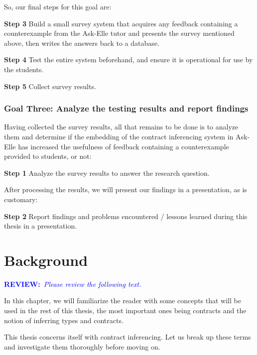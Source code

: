 \documentclass[10pt]{report}
\newcommand{\annotate}[3]{
	\begin{scriptsize}
	\textcolor{#1}{\textbf{#2}~\textit{#3}}
	\end{scriptsize}\newline}
\newcommand{\review}{\annotate{blue} {REVIEW:} {Please review the following text. \newline}}
\begin{document}
So, our final steps for this goal are:

\begin{description}
	\item{\textbf{Step 3}} Build a small survey system that acquires any feedback containing a counterexample from the Ask-Elle tutor and presents the survey mentioned above, then writes the answers back to a database.
	\item{\textbf{Step 4}} Test the entire system beforehand, and ensure it is operational for use by the students.
	\item{\textbf{Step 5}} Collect survey results.
\end{description}

\subsection{Goal Three: Analyze the testing results and report findings}

Having collected the survey results, all that remains to be done is to analyze them and determine if the embedding of the contract inferencing system in Ask-Elle has increased the usefulness of feedback containing a counterexample provided to students, or not:

\begin{description}
	\item{\textbf{Step 1}} Analyze the survey results to answer the research question.
\end{description}

After processing the results, we will present our findings in a presentation, as is customary:

\begin{description}
	\item{\textbf{Step 2}} Report findings and problems encountered / lessons learned during this thesis in a presentation.
\end{description}

\chapter{Background}

\review

In this chapter, we will familiarize the reader with some concepts that will be used in the rest of this thesis, the most important ones being contracts and the notion of inferring types and contracts.

This thesis concerns itself with contract inferencing.
Let us break up these terms and investigate them thoroughly before moving on.
\end{document}
